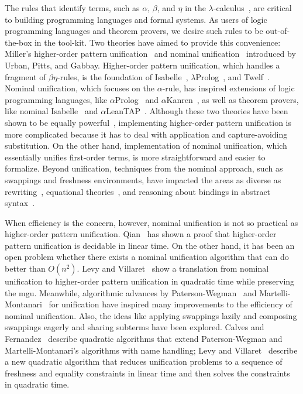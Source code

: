 \documentclass[a4paper,UKenglish]{lipics-v2016}
\begin{document}
The rules that identify terms, such as $\alpha$, $\beta$, and $\eta$
in the $\lambda$-calculus~\cite{church_calculi_1941}, are critical to
building programming languages and formal systems.  As users of logic
programming languages and theorem provers, we desire such rules to be
out-of-the-box in the tool-kit.  Two theories have aimed to provide
this convenience: Miller's higher-order pattern
unification~\cite{miller_logic_1989} and nominal
unification~\cite{urban_nominal_2004} introduced by Urban, Pitts, and
Gabbay.  Higher-order pattern unification, which handles a fragment of
$\beta\eta$-rules, is the foundation of
Isabelle~\cite{paulson_natural_1986},
$\lambda$Prolog~\cite{nadathur_overview_1988}, and
Twelf~\cite{pfenning_system_1999-1}.  Nominal unification, which
focuses on the $\alpha$-rule, has inspired extensions of logic
programming languages, like $\alpha$Prolog~\cite{cheney_prolog:_2004}
and $\alpha$Kanren~\cite{byrd_alphakanren:_2007}, as well as theorem
provers, like nominal Isabelle~\cite{urban_nominal_2005} and
$\alpha$LeanTAP~\cite{near_leantap:_2008}.  Although these two
theories have been shown to be equally
powerful~\cite{cheney_relating_2005, levy_nominal_2012}, implementing
higher-order pattern unification is more complicated because it has to
deal with application and capture-avoiding substitution.  On the other
hand, implementation of nominal unification, which essentially unifies
first-order terms, is more straightforward and easier to formalize.
Beyond unification, techniques from the nominal approach, such as
swappings and freshness environments, have impacted the areas as
diverse as rewriting~\cite{fernandez_nominal_2004,
  fernandez_nominal_2005, fernandez_nominal_2007, aoto_nominal_2016},
equational theories~\cite{ayala-rincon_nominal_2016}, and reasoning
about bindings in abstract syntax~\cite{pitts_metalanguage_2000,
  gabbay_new_2002}.

When efficiency is the concern, however, nominal unification is not so
practical as higher-order pattern unification.
Qian~\cite{qian_unification_1996} has shown a proof that higher-order
pattern unification is decidable in linear time.  On the other hand,
it has been an open problem whether there exists a nominal unification
algorithm that can do better than $O(n^2)$.  Levy and
Villaret~\cite{levy_nominal_2012} show a translation from nominal
unification to higher-order pattern unification in quadratic time
while preserving the mgu.  Meanwhile, algorithmic advances by
Paterson-Wegman~\cite{paterson_linear_1978} and
Martelli-Montanari~\cite{martelli_efficient_1982} for unification have
inspired many improvements to the efficiency of nominal unification.
Also, the ideas like applying swappings lazily and composing swappings
eagerly and sharing subterms have been explored.  Calves and
Fernandez~\cite{calves_polynomial_2008, calves_complexity_2010,
  calves_first-order_2010} describe quadratic algorithms that extend
Paterson-Wegman and Martelli-Montanari's algorithms with name
handling; Levy and Villaret~\cite{levy_efficient_2010} describe a new
quadratic algorithm that reduces unification problems to a sequence of
freshness and equality constraints in linear time and then solves the
constraints in quadratic time.
\end{document}
